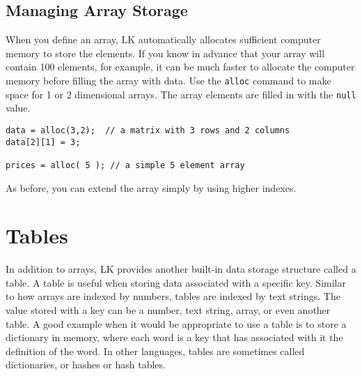 \documentclass{article}
\begin{document}
\subsection{Managing Array Storage}

When you define an array, LK automatically allocates sufficient computer memory to store the elements.  If you know in advance that your array will contain 100 elements, for example, it can be much faster to allocate the computer memory before filling the array with data.  Use the \texttt{alloc} command to make space for 1 or 2 dimensional arrays.  The array elements are filled in with the \texttt{null} value.

\begin{verbatim}
data = alloc(3,2);  // a matrix with 3 rows and 2 columns
data[2][1] = 3;

prices = alloc( 5 ); // a simple 5 element array
\end{verbatim}

As before, you can extend the array simply by using higher indexes.


\section{Tables}

In addition to arrays, LK provides another built-in data storage structure called a table.  A table is useful when storing data associated with a specific key.  Similar to how arrays are indexed by numbers, tables are indexed by text strings.  The value stored with a key can be a number, text string, array, or even another table.  A good example when it would be appropriate to use a table is to store a dictionary in memory, where each word is a key that has associated with it the definition of the word.  In other languages, tables are sometimes called dictionaries, or hashes or hash tables. 
\end{document}
